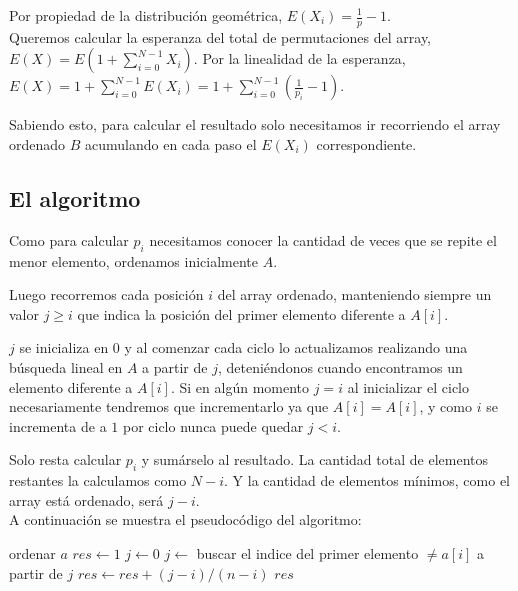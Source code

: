 Por propiedad de la distribución geométrica, $E(X_i) = \frac{1}{p} - 1$.
\\

Queremos calcular la esperanza del total de permutaciones del array, $E(X) = E(1 + \sum_{i=0}^{N-1} X_i)$.
Por la linealidad de la esperanza, $E(X) = 1 + \sum_{i=0}^{N-1} E(X_i) = 1 + \sum_{i=0}^{N-1} (\frac{1}{p_i} - 1)$.

Sabiendo esto, para calcular el resultado solo necesitamos ir recorriendo el array ordenado $B$
acumulando en cada paso el $E(X_i)$ correspondiente.

\subsection{El algoritmo}

Como para calcular $p_i$ necesitamos conocer la cantidad de veces que se repite el menor elemento,
ordenamos inicialmente $A$.

Luego recorremos cada posición $i$ del array ordenado,
manteniendo siempre un valor $j \geq i$ que indica la posición del primer elemento diferente a $A[i]$.

$j$ se inicializa en 0 y al comenzar cada ciclo lo actualizamos realizando una búsqueda lineal
en $A$ a partir de $j$, deteniéndonos cuando encontramos un elemento diferente a $A[i]$.
Si en algún momento $j = i$ al inicializar el ciclo necesariamente tendremos que incrementarlo ya que $A[i] = A[i]$, y como $i$ se incrementa de a $1$ por ciclo nunca puede quedar $j<i$.

Solo resta calcular $p_i$ y sumárselo al resultado. La cantidad total de elementos restantes la calculamos como $N - i$. Y la cantidad de elementos mínimos, como el array está ordenado, será $j - i$.
\\

A continuación se muestra el pseudocódigo del algoritmo:

\newpage

\begin{algorithmic}

    \State ordenar $a$
    \State $res \gets 1$
    \State $j \gets 0$
        \State $j \gets$ buscar el indice del primer elemento $\neq a[i]$ a partir de $j$
        \State $res \gets res + (j-i)/(n-i)$
    \EndFor
    \State \Return $res$
\EndFunction

\end{algorithmic}

